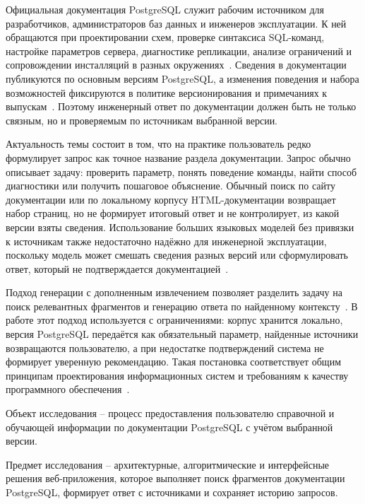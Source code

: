 \Introduction

Официальная документация PostgreSQL служит рабочим источником для разработчиков, администраторов баз данных и инженеров эксплуатации. К ней обращаются при проектировании схем, проверке синтаксиса SQL-команд, настройке параметров сервера, диагностике репликации, анализе ограничений и сопровождении инсталляций в разных окружениях~\cite{postgres-docs,postgres-docs-16,postgres-docs-17,postgres-docs-18}. Сведения в документации публикуются по основным версиям PostgreSQL, а изменения поведения и набора возможностей фиксируются в политике версионирования и примечаниях к выпускам~\cite{postgres-versioning,postgres-release-root}. Поэтому инженерный ответ по документации должен быть не только связным, но и проверяемым по источникам выбранной версии.

Актуальность темы состоит в том, что на практике пользователь редко формулирует запрос как точное название раздела документации. Запрос обычно описывает задачу: проверить параметр, понять поведение команды, найти способ диагностики или получить пошаговое объяснение. Обычный поиск по сайту документации или по локальному корпусу HTML-документации возвращает набор страниц, но не формирует итоговый ответ и не контролирует, из какой версии взяты сведения. Использование больших языковых моделей без привязки к источникам также недостаточно надёжно для инженерной эксплуатации, поскольку модель может смешать сведения разных версий или сформулировать ответ, который не подтверждается документацией~\cite{lewis2020rag,dpr2020,sbert2019,colbert2020,bert2018}.

Подход генерации с дополненным извлечением позволяет разделить задачу на поиск релевантных фрагментов и генерацию ответа по найденному контексту~\cite{lewis2020rag}. В работе этот подход используется с ограничениями: корпус хранится локально, версия PostgreSQL передаётся как обязательный параметр, найденные источники возвращаются пользователю, а при недостатке подтверждений система не формирует уверенную рекомендацию. Такая постановка соответствует общим принципам проектирования информационных систем и требованиям к качеству программного обеспечения~\cite{sommerville2016,pressman2020,gost-r-iso-25010-2015}.

Объект исследования -- процесс предоставления пользователю справочной и обучающей информации по документации PostgreSQL с учётом выбранной версии.

Предмет исследования -- архитектурные, алгоритмические и интерфейсные решения веб-приложения, которое выполняет поиск фрагментов документации PostgreSQL, формирует ответ с источниками и сохраняет историю запросов.

